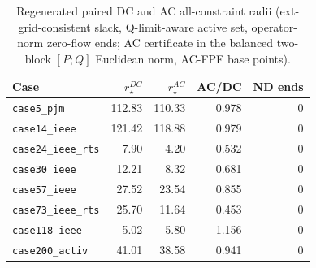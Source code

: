 \begin{table}[t]
\centering
\caption{Regenerated paired DC and AC all-constraint radii (ext-grid-consistent
slack, Q-limit-aware active set, operator-norm zero-flow ends; AC certificate
in the balanced two-block $[P;Q]$ Euclidean norm, AC-FPF base points).
\label{tab:dc-ac}}
\footnotesize
\begin{tabularx}{\textwidth}{@{}Xrrrr@{}}
\toprule
Case & $r_\star^{DC}$ & $r_\star^{AC}$ & AC/DC & ND ends \\
\midrule
\texttt{case5\_pjm} & 112.83 & 110.33 & 0.978 & 0 \\
\texttt{case14\_ieee} & 121.42 & 118.88 & 0.979 & 0 \\
\texttt{case24\_ieee\_rts} & 7.90 & 4.20 & 0.532 & 0 \\
\texttt{case30\_ieee} & 12.21 & 8.32 & 0.681 & 0 \\
\texttt{case57\_ieee} & 27.52 & 23.54 & 0.855 & 0 \\
\texttt{case73\_ieee\_rts} & 25.70 & 11.64 & 0.453 & 0 \\
\texttt{case118\_ieee} & 5.02 & 5.80 & 1.156 & 0 \\
\texttt{case200\_activ} & 41.01 & 38.58 & 0.941 & 0 \\
\bottomrule
\end{tabularx}
\end{table}
